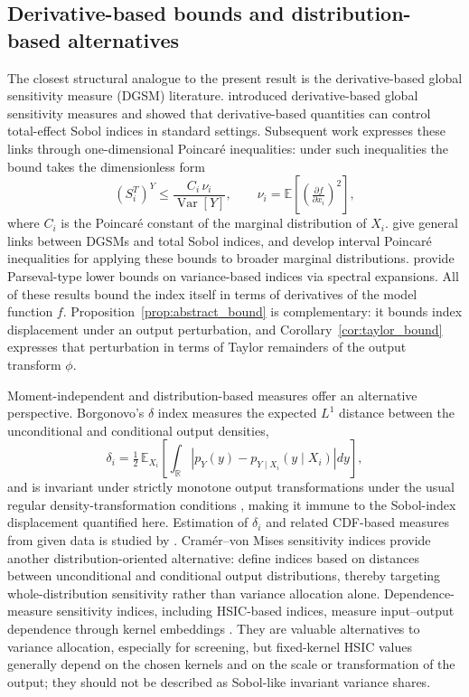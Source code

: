 \documentclass[11pt,letterpaper]{article}
\DeclareMathOperator{\Var}{Var}
\newcommand{\E}{\mathbb{E}}
\newcommand{\R}{\mathbb{R}}
\theoremstyle{remark}
\begin{document}
\subsection{Derivative-based bounds and distribution-based alternatives}

The closest structural analogue to the present result is the derivative-based
global sensitivity measure (DGSM) literature. \citet{SobolKucherenko2009}
introduced derivative-based global sensitivity measures and showed that
derivative-based quantities can control total-effect Sobol indices in standard
settings. Subsequent work expresses these links through one-dimensional
Poincar\'{e} inequalities: under such inequalities the bound takes the
dimensionless form
\begin{equation}
  (S_i^T)^Y\leq \frac{C_i\,\nu_i}{\Var[Y]},\qquad
  \nu_i=\E\!\left[\!\left(\tfrac{\partial f}{\partial x_i}\right)^{\!2}\right],
  \label{eq:dgsm_bound}
\end{equation}
where $C_i$ is the Poincar\'{e} constant of the marginal distribution of $X_i$.
\citet{Lamboni2013} give general links between DGSMs and total Sobol indices,
and \citet{Roustant2017} develop interval Poincar\'{e} inequalities for applying
these bounds to broader marginal distributions. \citet{Roustant2020} provide
Parseval-type lower bounds on variance-based indices via spectral expansions.
All of these results bound the index itself in terms of derivatives of the model
function $f$. Proposition~\ref{prop:abstract_bound} is complementary: it bounds
index displacement under an output perturbation, and
Corollary~\ref{cor:taylor_bound} expresses that perturbation in terms of Taylor
remainders of the output transform $\phi$.

Moment-independent and distribution-based measures offer an alternative
perspective. Borgonovo's $\delta$ index \citep{Borgonovo2007} measures the
expected $L^1$ distance between the unconditional and conditional output
densities,
\begin{equation}
  \delta_i=\tfrac12\,\E_{X_i}\!\left[
    \int_{\R}\left|p_Y(y)-p_{Y\mid X_i}(y\mid X_i)\right|dy
  \right],
  \label{eq:delta_index}
\end{equation}
and is invariant under strictly monotone output transformations under the usual
regular density-transformation conditions \citep{Borgonovo2014}, making it
immune to the Sobol-index displacement quantified here. Estimation of
$\delta_i$ and related CDF-based measures from given data is studied by
\citet{Plischke2013}. Cram\'{e}r--von Mises sensitivity indices provide another
distribution-oriented alternative: \citet{GamboaKleinLagnoux2018} define indices
based on distances between unconditional and conditional output distributions,
thereby targeting whole-distribution sensitivity rather than variance allocation
alone. Dependence-measure sensitivity indices, including HSIC-based indices,
measure input--output dependence through kernel embeddings \citep{DaVeiga2015}.
They are valuable alternatives to variance allocation, especially for screening,
but fixed-kernel HSIC values generally depend on the chosen kernels and on the
scale or transformation of the output; they should not be described as
Sobol-like invariant variance shares.
\end{document}
